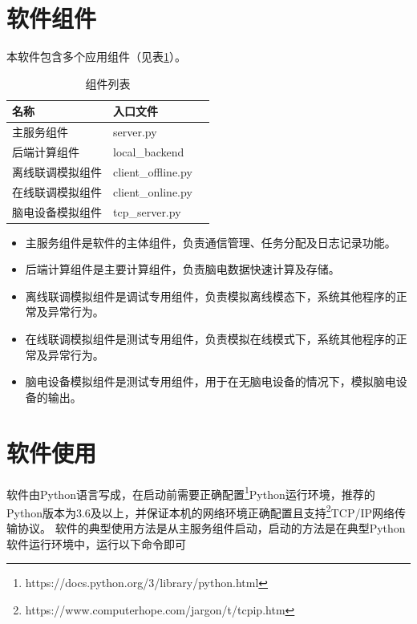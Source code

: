 \documentclass[UTF8]{article}
\begin{document}
\section{软件组件}

本软件包含多个应用组件（见表\ref{tabel:components}）。

\begin{table}[h!]
    \begin{center}
        \caption{组件列表}
        \label{tabel:components}
        \begin{tabular}{|l|l|l}
            \hline
            名称             & 入口文件           \\
            \hline
            主服务组件       & server.py          \\
            \hline
            后端计算组件     & local\_backend     \\
            \hline
            离线联调模拟组件 & client\_offline.py \\
            \hline
            在线联调模拟组件 & client\_online.py  \\
            \hline
            脑电设备模拟组件 & tcp\_server.py     \\
            \hline
        \end{tabular}
    \end{center}
\end{table}

\begin{itemize}
    \item 主服务组件是软件的主体组件，负责通信管理、任务分配及日志记录功能。
    \item 后端计算组件是主要计算组件，负责脑电数据快速计算及存储。
    \item 离线联调模拟组件是调试专用组件，负责模拟离线模态下，系统其他程序的正常及异常行为。
    \item 在线联调模拟组件是测试专用组件，负责模拟在线模式下，系统其他程序的正常及异常行为。
    \item 脑电设备模拟组件是测试专用组件，用于在无脑电设备的情况下，模拟脑电设备的输出。
\end{itemize}

\section{软件使用}
软件由Python语言写成，在启动前需要正确配置\footnote{https://docs.python.org/3/library/python.html}{Python}运行环境，推荐的Python版本为3.6及以上，并保证本机的网络环境正确配置且支持\footnote{https://www.computerhope.com/jargon/t/tcpip.htm}{TCP/IP网络传输协议}。
软件的典型使用方法是从主服务组件启动，启动的方法是在典型Python软件运行环境中，运行以下命令即可
\end{document}
